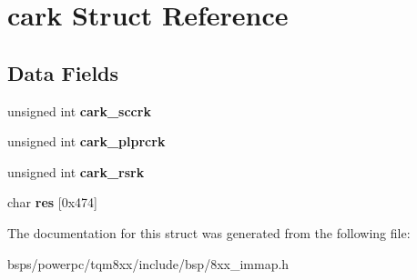 \hypertarget{structcark}{}\section{cark Struct Reference}
\label{structcark}
\subsection*{Data Fields}
\begin{DoxyCompactItemize}
\item 
\mbox{\label{structcark_a48e9c6d3af92e2da163e2c2581440e92}} 
unsigned int {\bfseries cark\+\_\+sccrk}
\item 
\mbox{\label{structcark_a9f779fc1d4c6c9e7a4d3718ddd6eab7e}} 
unsigned int {\bfseries cark\+\_\+plprcrk}
\item 
\mbox{\label{structcark_ace5ad06f9fa6529763d6b9df7c378c82}} 
unsigned int {\bfseries cark\+\_\+rsrk}
\item 
\mbox{\label{structcark_af2d8dcc23316b851964b5e6563a22ef9}} 
char {\bfseries res} \mbox{[}0x474\mbox{]}
\end{DoxyCompactItemize}


The documentation for this struct was generated from the following file\+:\begin{DoxyCompactItemize}
\item 
bsps/powerpc/tqm8xx/include/bsp/8xx\+\_\+immap.\+h\end{DoxyCompactItemize}
